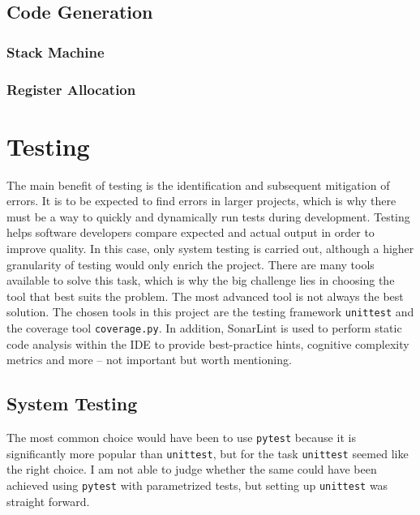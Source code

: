 \newpage

\section{Code Generation} \label{sec:code-gen}
\cite{ModernCompilerImplementation}

\newpage

\subsection{Stack Machine}

\newpage

\subsection{Register Allocation}

\chapter{Testing}
The main benefit of testing is the identification and subsequent mitigation of errors. It is to be expected to find errors in larger projects, which is why there must be a way to quickly and dynamically run tests during development. Testing helps software developers compare expected and actual output in order to improve quality. In this case, only system testing is carried out, although a higher granularity of testing would only enrich the project. There are many tools available to solve this task, which is why the big challenge lies in choosing the tool that best suits the problem. The most advanced tool is not always the best solution. The chosen tools in this project are the testing framework \texttt{unittest} and the coverage tool \texttt{coverage.py}. In addition, SonarLint is used to perform static code analysis within the IDE to provide best-practice hints, cognitive complexity metrics and more -- not important but worth mentioning.

\section{System Testing}
The most common choice would have been to use \texttt{pytest} because it is significantly more popular than \texttt{unittest}, but for the task \texttt{unittest} seemed like the right choice. I am not able to judge whether the same could have been achieved using \texttt{pytest} with parametrized tests, but setting up \texttt{unittest} was straight forward.

